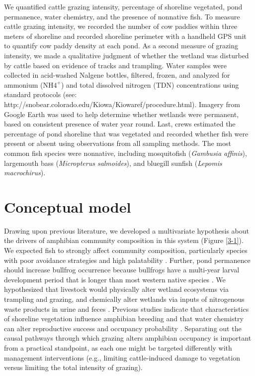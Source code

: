 We quantified cattle grazing intensity, percentage of shoreline
vegetated, pond permanence, water chemistry, and the presence of
nonnative fish. To measure cattle grazing intensity, we recorded the
number of cow paddies within three meters of shoreline and recorded
shoreline perimeter with a handheld GPS unit to quantify cow paddy
density at each pond. As a second measure of grazing intensity, we made
a qualitative judgment of whether the wetland was disturbed by cattle
based on evidence of tracks and trampling. Water samples were collected
in acid-washed Nalgene bottles, filtered, frozen, and analyzed for
ammonium (NH$4^+$) and total dissolved nitrogen (TDN) concentrations
using standard protocols (see:
http://snobear.colorado.edu/Kiowa/Kiowaref/procedure.html). Imagery from
Google Earth was used to help determine whether wetlands were permanent,
based on consistent presence of water year round. Last, crews estimated
the percentage of pond shoreline that was vegetated and recorded whether
fish were present or absent using observations from all sampling
methods. The most common fish species were nonnative, including
mosquitofish (\textit{Gambusia affinis}), largemouth bass
(\textit{Micropterus salmoides}), and bluegill sunfish (\textit{Lepomis
macrochirus}).

\section{Conceptual model}

Drawing upon previous literature, we developed a multivariate hypothesis
about the drivers of amphibian community composition in this system
(Figure \ref{3-1}). We expected fish to strongly affect community composition,
particularly species with poor avoidance strategies and high
palatability \citep{Kruse1984, Kats1988, Adams2000, Welsh2006b}.
Further, pond permanence should increase bullfrog
occurrence because bullfrogs have a multi-year larval development period
that is longer than most western native species \citep{Collins1979}. We
hypothesized that livestock would physically alter wetland ecosystems
via trampling and grazing, and chemically alter wetlands via inputs of
nitrogenous waste products in urine and feces \citep{adams2009, Schmutzer2008, Jansen2003207, Knutson2004, Kauffman1983}.
Previous studies indicate that characteristics of
shoreline vegetation influence amphibian breeding and that water
chemistry can alter reproductive success and occupancy probability \citep{Earl2009, Burne2005, Egan2004, Jansen2003207, Brodman2003, Rouse1999, rowe1995, freda1986}.
Separating out the causal
pathways through which grazing alters amphibian occupancy is important
from a practical standpoint, as each one might be targeted differently
with management interventions (e.g., limiting cattle-induced damage to
vegetation versus limiting the total intensity of grazing).

